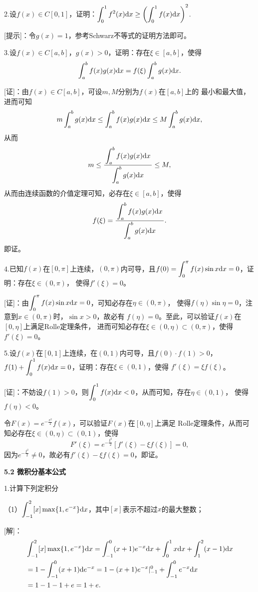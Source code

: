 \bs

2.设$f(x)\in C[0,1]$，证明：$\displaystyle\int_0^1f^2(x)\mathrm{d} x\geq
\left(\displaystyle\int_0^1f(x)\mathrm{d} x\right)^2$.

[提示]：令$g(x)=1$，参考Schwarz不等式的证明方法即可。

\bs

3.设$f(x)\in C[a,b]$，$g(x)>0$，证明：存在$\xi\in[a,b]$，使得
$$\displaystyle\int_a^bf(x)g(x)\mathrm{d} x=f(\xi)\displaystyle\int_a^bg(x)\mathrm{d} x.$$

[证]：由$f(x)\in C[a,b]$，可设$m,M$分别为$f(x)$在$[a,b]$上的
最小和最大值，进而可知
$$m\displaystyle\int_a^bg(x)\mathrm{d} x\leq \displaystyle\int_a^bf(x)g(x)\mathrm{d} x\leq M\displaystyle\int_a^bg(x)\mathrm{d} x,$$
从而
$$m\leq\displaystyle\frac{\,{\displaystyle\int_a^bf(x)g(x)\mathrm{d} x}\,}{\,{\displaystyle\int_a^bg(x)\mathrm{d} x}\,}\leq M,$$
从而由连续函数的介值定理可知，必存在$\xi\in[a,b]$，使得
$$f(\xi)=\displaystyle\frac{\,{\displaystyle\int_a^bf(x)g(x)\mathrm{d} x}\,}{\,{\displaystyle\int_a^bg(x)\mathrm{d} x}\,}.$$
即证。\fin

\bs

4.已知$f(x)$在$[0,\pi]$上连续，$(0,\pi)$内可导，且$f(0)=
\displaystyle\int_0^{\pi}f(x)\sin x\mathrm{d} x=0$，证明：存在$\xi\in(0,\pi)$，
使得$f'(\xi)=0$。

[证]：由$\displaystyle\int_0^{\pi}f(x)\sin x\mathrm{d} x=0$，可知必存在$\eta\in(0,\pi)$，
使得$f(\eta)\sin\eta=0$，注意到$x\in(0,\pi)$时，$\sin x>0$，故必有
$f(\eta)=0$。至此，可以验证$f(x)$在$[0,\eta]$上满足Rolle定理条件，
进而可知必存在$\xi\in(0,\eta)\subset (0,\pi)$，使得$f'(\xi)=0$。\fin

5.设$f(x)$在$[0,1]$上连续，在$(0,1)$内可导，且$f(0)\cdot f(1)>0$，
$f(1)+\displaystyle\int_0^1f(x)\mathrm{d} x=0$，证明：存在$\xi\in(0,1)$，使得
$f'(\xi)=\xi f(\xi)$。

[证]：不妨设$f(1)>0$，则$\displaystyle\int_0^1f(x)\mathrm{d} x<0$，从而可知，存在$\eta\in(0,1)$，
使得$f(\eta)<0$。

令$F(x)=e^{-\frac{x^2}2}f(x)$，可以验证$F(x)$在$[0,\eta]$上满足
Rolle定理条件，从而可知必存在$\xi\in(0,\eta)\subset(0,1)$，使得
$$F'(\xi)=e^{-\frac{\xi^2}2}[f'(\xi)-\xi f(\xi)]=0,$$
因为$e^{-\frac{\xi^2}2}\ne0$，故必有$f'(\xi)-\xi f(\xi)=0$，即证。\fin

\begin{center}
	\bf 5.2 微积分基本公式
\end{center}

1.计算下列定积分

（1）$\displaystyle\int_{-1}^2[x]\max\{1,e^{-x}\}\mathrm{d} x$，其中$[x]$表示不超过$x$的最大整数；

[解]：
\begin{align*}
	&\displaystyle\int_{-1}^2[x]\max\{1,e^{-x}\}\mathrm{d} x
	=\displaystyle\int_{-1}^0(x+1)e^{-x}\mathrm{d} x+\displaystyle\int_0^1x\mathrm{d} x+\displaystyle\int_1^2(x-1)\mathrm{d} x\\
	&=1-\displaystyle\int_{-1}^0(x+1)\mathrm{d} e^{-x}
	=1-(x+1)e^{-x}|_{-1}^0+\displaystyle\int_{-1}^0e^{-x}\mathrm{d} x\\
	&=1-1-1+e=1+e.
\end{align*}

